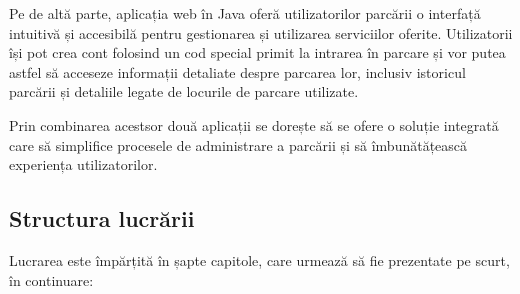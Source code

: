\documentclass[12pt]{article}
\begin{document}
Pe de alt\u{a} parte, aplicația web \^{i}n Java ofer\u{a} utilizatorilor parc\u{a}rii o interfaț\u{a} intuitiv\u{a} și accesibil\u{a} pentru gestionarea și utilizarea serviciilor oferite. Utilizatorii \^{i}și pot crea cont folosind un cod special primit la intrarea \^{i}n parcare și vor putea astfel s\u{a} acceseze informații detaliate despre parcarea lor, inclusiv istoricul parc\u{a}rii și detaliile legate de locurile de parcare utilizate.

Prin combinarea acestsor dou\u{a} aplicații se dorește s\u{a} se ofere o soluție integrat\u{a} care s\u{a} simplifice procesele de administrare a parc\u{a}rii și s\u{a} \^{i}mbun\u{a}t\u{a}țeasc\u{a} experiența utilizatorilor. 

\subsection{Structura lucr\u{a}rii}

Lucrarea este \^{i}mp\u{a}rțit\u{a} \^{i}n șapte capitole, care urmeaz\u{a} s\u{a} fie prezentate pe scurt, \^{i}n continuare:
\end{document}
